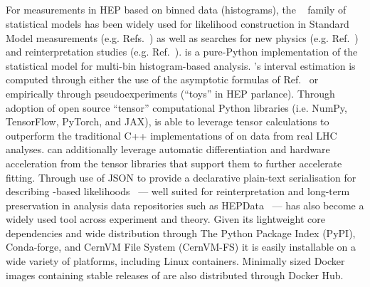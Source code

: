 \subsection{\pyhf{}}\label{subsec:pyhf}

For measurements in HEP based on binned data (histograms), the \HiFa{}~\cite{Cranmer:1456844} family of statistical models has been widely used for likelihood construction in Standard Model measurements (e.g. Refs.~\cite{HIGG-2013-02,Aaij:2015sqa}) as well as searches for new physics (e.g. Ref.~\cite{SUSY-2016-10}) and reinterpretation studies (e.g. Ref.~\cite{Alguero:2020grj}).
\pyhf{} is a pure-Python implementation of the \HiFa{} statistical model for multi-bin histogram-based analysis.
\pyhf{}'s interval estimation is computed through either the use of the asymptotic formulas of Ref.~\cite{Cowan:2010js} or empirically through pseudoexperiments (``toys'' in HEP parlance).
Through adoption of open source ``tensor'' computational Python libraries (i.e. NumPy, TensorFlow, PyTorch, and JAX), \pyhf{} is able to leverage tensor calculations to outperform the traditional C++ implementations of \HiFa{} on data from real LHC analyses.
\pyhf{} can additionally leverage automatic differentiation and hardware acceleration from the tensor libraries that support them to further accelerate fitting.
Through use of JSON to provide a declarative plain-text serialisation for describing \HiFa{}-based likelihoods~\cite{ATL-PHYS-PUB-2019-029} --- well suited for reinterpretation and long-term preservation in analysis data repositories such as HEPData~\cite{Maguire:2017ypu} --- \pyhf{} has also become a widely used tool across experiment and theory.
Given its lightweight core dependencies and wide distribution through The Python Package Index (PyPI), Conda-forge, and CernVM File System (CernVM-FS) it is easily installable on a wide variety of platforms, including Linux containers.
Minimally sized Docker images containing stable releases of \pyhf{} are also distributed through Docker Hub.

